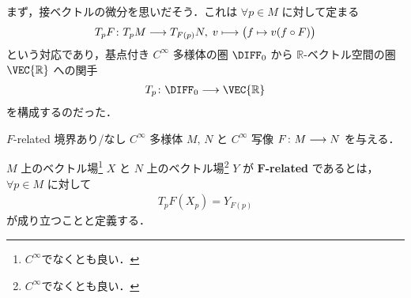 \documentclass[TQFT_main]{subfiles}
\begin{document}
まず，接ベクトルの微分を思いだそう．これは $\forall p \in M$ に対して定まる
\begin{align}
    T_{p} F \colon T_p M \longrightarrow T_{F(p)} N,\; v \longmapsto \bigl(f \mapsto v(f \circ F)\bigr)
\end{align}
という対応であり，基点付き $C^\infty$ 多様体の圏 $\DIFF_0$ から $\mathbb{R}$-ベクトル空間の圏 $\VEC{\mathbb{R}}$ への関手
\begin{align}
    T_p \colon \DIFF_0 \lto \VEC{\mathbb{R}}
\end{align}
を構成するのだった．

\begin{mydef}[label=def:F-related]{$F$-related}
    境界あり/なし $C^\infty$ 多様体 $M,\, N$ と $C^\infty$ 写像 $F \colon M \longrightarrow N$ を与える．

    $M$ 上のベクトル場\footnote{\hyperref[def:vecf]{$C^\infty$}でなくとも良い．} $X$ と $N$ 上のベクトル場\footnote{\hyperref[def:vecf]{$C^\infty$}でなくとも良い．} $Y$ が $\bm{F}$\textbf{-related} であるとは，
    $\forall p \in M$ に対して
    \begin{align}
        T_p F (X_p) = Y_{F(p)}
    \end{align}
    が成り立つことと定義する．
\end{mydef}
\end{document}
